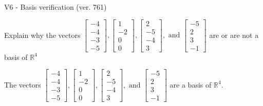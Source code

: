 \begin{exercise}
  \begin{exerciseTitle}V6 - Basis verification (ver. 761)\end{exerciseTitle}
  \begin{exerciseStatement}
    Explain why the vectors \(\left[\begin{array}{r}
-4 \\
-4 \\
-3 \\
-5
\end{array}\right] , \left[\begin{array}{r}
1 \\
-2 \\
0 \\
0
\end{array}\right] , \left[\begin{array}{r}
2 \\
-5 \\
-4 \\
3
\end{array}\right] , \text{ and } \left[\begin{array}{r}
-5 \\
2 \\
3 \\
-1
\end{array}\right]\) are or are not a basis of \(\mathbb{R}^4\)	


  \end{exerciseStatement}
  \begin{exerciseAnswer}
   The vectors \(\left[\begin{array}{r}
-4 \\
-4 \\
-3 \\
-5
\end{array}\right] , \left[\begin{array}{r}
1 \\
-2 \\
0 \\
0
\end{array}\right] , \left[\begin{array}{r}
2 \\
-5 \\
-4 \\
3
\end{array}\right] , \text{ and } \left[\begin{array}{r}
-5 \\
2 \\
3 \\
-1
\end{array}\right]\) 
  	 are  a basis of \(\mathbb{R}^4\).
  


  \end{exerciseAnswer}
\end{exercise}